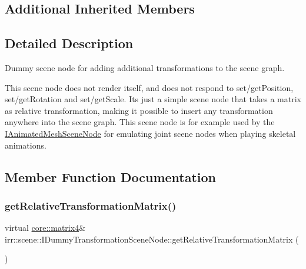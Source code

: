 \subsection*{Additional Inherited Members}


\subsection{Detailed Description}
Dummy scene node for adding additional transformations to the scene graph. 

This scene node does not render itself, and does not respond to set/get\+Position, set/get\+Rotation and set/get\+Scale. Its just a simple scene node that takes a matrix as relative transformation, making it possible to insert any transformation anywhere into the scene graph. This scene node is for example used by the \hyperlink{classirr_1_1scene_1_1IAnimatedMeshSceneNode}{I\+Animated\+Mesh\+Scene\+Node} for emulating joint scene nodes when playing skeletal animations. 

\subsection{Member Function Documentation}
\mbox{\label{classirr_1_1scene_1_1IDummyTransformationSceneNode_a95612d8bb225213c907fbf5a2606f0d3}} 
\subsubsection{\texorpdfstring{get\+Relative\+Transformation\+Matrix()}{getRelativeTransformationMatrix()}\hspace{0.1cm}{\footnotesize\ttfamily [1/2]}}
{\footnotesize\ttfamily virtual \hyperlink{namespaceirr_1_1core_a4c9d4e29899535971052810954a14431}{core\+::matrix4}\& irr\+::scene\+::\+I\+Dummy\+Transformation\+Scene\+Node\+::get\+Relative\+Transformation\+Matrix (\begin{DoxyParamCaption}{ }\end{DoxyParamCaption})\hspace{0.3cm}{\ttfamily [pure virtual]}}




